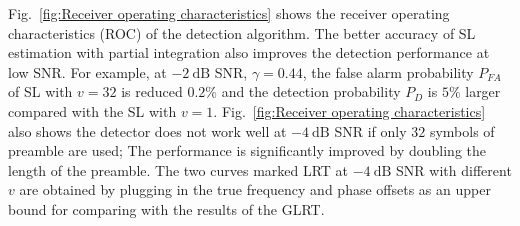 

Fig.~\ref{fig:Receiver operating characteristics} shows the receiver
operating characteristics (ROC) of the detection algorithm. 
The better accuracy of SL estimation with partial integration also
improves the detection performance  at low SNR.
For example, at $\SI{-2}{\dB}$ SNR, $\gamma=0.44$, the false alarm probability $P_{FA}$ of SL with $v=32$ is reduced $0.2\%$ and 
the detection probability $P_{D}$ is $5\%$ larger compared with the SL with $v{=}1$. 
Fig.~\ref{fig:Receiver operating characteristics} also shows the detector does not work well at $\SI{-4}{\dB}$ SNR if only $32$ symbols of preamble are used;  
The performance is significantly improved by doubling the length of
the preamble. The two curves marked LRT at $\SI{-4}{\dB}$ SNR with different $v$
are obtained by plugging in the true frequency and phase offsets as an upper bound for comparing with 
the results of the GLRT.   


